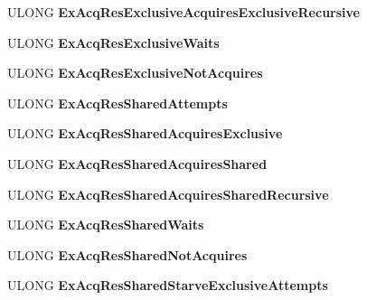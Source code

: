 \begin{DoxyCompactItemize}
U\+L\+O\+NG {\bfseries Ex\+Acq\+Res\+Exclusive\+Acquires\+Exclusive\+Recursive}
\item 
\mbox{\label{struct___s_y_n_c_h___c_o_u_n_t_e_r_s_a4e2b1a3131c6ab914fef82210b5733b6}} 
U\+L\+O\+NG {\bfseries Ex\+Acq\+Res\+Exclusive\+Waits}
\item 
\mbox{\label{struct___s_y_n_c_h___c_o_u_n_t_e_r_s_a2cdba0d287bafa29b681570558cd5519}} 
U\+L\+O\+NG {\bfseries Ex\+Acq\+Res\+Exclusive\+Not\+Acquires}
\item 
\mbox{\label{struct___s_y_n_c_h___c_o_u_n_t_e_r_s_a6d7b8916e05a806b8957d5cd84b3f5db}} 
U\+L\+O\+NG {\bfseries Ex\+Acq\+Res\+Shared\+Attempts}
\item 
\mbox{\label{struct___s_y_n_c_h___c_o_u_n_t_e_r_s_a2991a93c37627bc5bea6e2c5cddcb70b}} 
U\+L\+O\+NG {\bfseries Ex\+Acq\+Res\+Shared\+Acquires\+Exclusive}
\item 
\mbox{\label{struct___s_y_n_c_h___c_o_u_n_t_e_r_s_aa37b6eaee1ac67ed8cd8d9f1a4dfafcb}} 
U\+L\+O\+NG {\bfseries Ex\+Acq\+Res\+Shared\+Acquires\+Shared}
\item 
\mbox{\label{struct___s_y_n_c_h___c_o_u_n_t_e_r_s_af02525c46de6e08ef75b9921fedc01c9}} 
U\+L\+O\+NG {\bfseries Ex\+Acq\+Res\+Shared\+Acquires\+Shared\+Recursive}
\item 
\mbox{\label{struct___s_y_n_c_h___c_o_u_n_t_e_r_s_a5547293d3f7cf66db4b001fb8b3c35e8}} 
U\+L\+O\+NG {\bfseries Ex\+Acq\+Res\+Shared\+Waits}
\item 
\mbox{\label{struct___s_y_n_c_h___c_o_u_n_t_e_r_s_ac9bded4a6d7aa395d68e1c32befd0478}} 
U\+L\+O\+NG {\bfseries Ex\+Acq\+Res\+Shared\+Not\+Acquires}
\item 
\mbox{\label{struct___s_y_n_c_h___c_o_u_n_t_e_r_s_a6a3887c9be98fd01ebc8d05de6a6e90e}} 
U\+L\+O\+NG {\bfseries Ex\+Acq\+Res\+Shared\+Starve\+Exclusive\+Attempts}

\end{DoxyCompactItemize}
